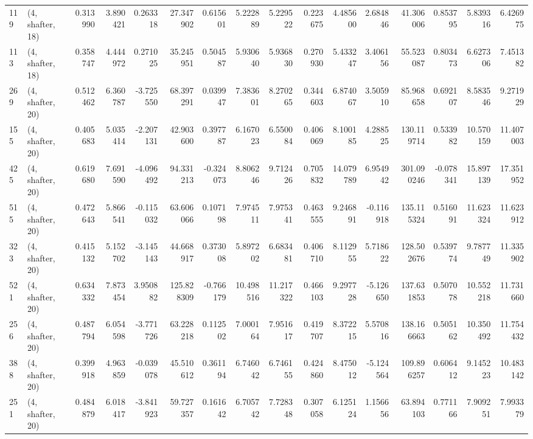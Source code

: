\begin{tabular}{llrrrrrrrrrrrrrr}
119 &  (4, shafter, 18) &   0.313990 &   3.890421 &   0.263318 &    27.347902 &   0.615601 &   5.222889 &   5.229522 &  0.223675 &   4.485600 &   2.684846 &     41.306006 &   0.853795 &   5.839316 &    6.426975 \\
113 &  (4, shafter, 18) &   0.358747 &   4.444972 &   0.271025 &    35.245951 &   0.504587 &   5.930640 &   5.936830 &  0.270930 &   5.433247 &   3.406156 &     55.523087 &   0.803473 &   6.627306 &    7.451382 \\
269 &  (4, shafter, 20) &   0.512462 &   6.360787 &  -3.725550 &    68.397291 &   0.039947 &   7.383601 &   8.270265 &  0.344603 &   6.874067 &   3.505910 &     85.968658 &   0.692107 &   8.583546 &    9.271929 \\
155 &  (4, shafter, 20) &   0.405683 &   5.035414 &  -2.207131 &    42.903600 &   0.397787 &   6.167023 &   6.550084 &  0.406069 &   8.100185 &   4.288525 &    130.119714 &   0.533982 &  10.570159 &   11.407003 \\
425 &  (4, shafter, 20) &   0.619680 &   7.691590 &  -4.096492 &    94.331213 &  -0.324073 &   8.806246 &   9.712426 &  0.705832 &  14.079789 &   6.954942 &    301.090246 &  -0.078341 &  15.897139 &   17.351952 \\
515 &  (4, shafter, 20) &   0.472643 &   5.866541 &  -0.115032 &    63.606066 &   0.107198 &   7.974511 &   7.975341 &  0.463555 &   9.246891 &  -0.116918 &    135.115324 &   0.516091 &  11.623324 &   11.623912 \\
323 &  (4, shafter, 20) &   0.415132 &   5.152702 &  -3.145143 &    44.668917 &   0.373008 &   5.897202 &   6.683481 &  0.406710 &   8.112955 &   5.718622 &    128.502676 &   0.539774 &   9.787749 &   11.335902 \\
521 &  (4, shafter, 20) &   0.634332 &   7.873454 &   3.950882 &   125.828309 &  -0.766179 &  10.498516 &  11.217322 &  0.466103 &   9.297728 &  -5.126650 &    137.631853 &   0.507078 &  10.552218 &   11.731660 \\
256 &  (4, shafter, 20) &   0.487794 &   6.054598 &  -3.771726 &    63.228218 &   0.112502 &   7.000164 &   7.951617 &  0.419707 &   8.372215 &   5.570816 &    138.166663 &   0.505162 &  10.350492 &   11.754432 \\
388 &  (4, shafter, 20) &   0.399918 &   4.963859 &  -0.039078 &    45.510612 &   0.361194 &   6.746042 &   6.746155 &  0.424860 &   8.475012 &  -5.124564 &    109.896257 &   0.606412 &   9.145223 &   10.483142 \\
251 &  (4, shafter, 20) &   0.484879 &   6.018417 &  -3.841923 &    59.727357 &   0.161642 &   6.705742 &   7.728348 &  0.307058 &   6.125124 &   1.156656 &     63.894103 &   0.771166 &   7.909251 &    7.993379 \\

\end{tabular}
